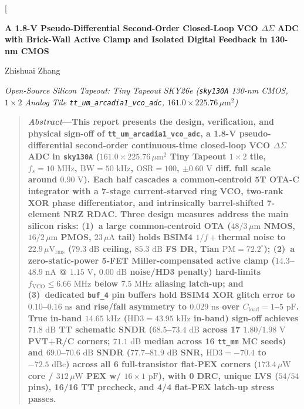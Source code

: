 \documentclass[10pt,twocolumn,letterpaper]{article}
\begin{document}
\thispagestyle{firstpage}

\twocolumn[{%
\begin{center}
  {\LARGE\bfseries A 1.8-V Pseudo-Differential Second-Order Closed-Loop VCO $\Delta\Sigma$ ADC with Brick-Wall Active Clamp and Isolated Digital Feedback in 130-nm CMOS\par}
  \vspace{5pt}
  {\normalsize Zhishuai Zhang\par}
  \vspace{1.5pt}
  {\footnotesize\itshape Open-Source Silicon Tapeout: Tiny Tapeout SKY26e (\textup{\texttt{sky130A}} 130-nm CMOS, $1\times2$ Analog Tile \textup{\texttt{tt\_um\_arcadia1\_vco\_adc}}, $161.0 \times 225.76\,\mu\text{m}^2$)\par}
\end{center}
\vspace{3pt}
\begin{quote}
\small
\textbf{\textit{Abstract}---This report presents the design, verification, and physical sign-off of \textup{\texttt{tt\_um\_arcadia1\_vco\_adc}}, a 1.8-V pseudo-differential second-order continuous-time closed-loop VCO $\Delta\Sigma$ ADC in \textup{\texttt{sky130A}} ($161.0\times225.76\,\mu\text{m}^2$ Tiny Tapeout $1\times2$ tile, $f_s=10\text{ MHz}$, $\text{BW}=50\text{ kHz}$, $\text{OSR}=100$, $\pm0.60\text{ V}$ diff. full scale around $0.90\text{ V}$). Each half cascades a common-centroid 5T OTA-C integrator with a 7-stage current-starved ring VCO, two-rank XOR phase differentiator, and intrinsically barrel-shifted 7-element NRZ RDAC. Three design measures address the main silicon risks: (1)~a large common-centroid OTA ($48/3\,\mu\text{m}$ NMOS, $16/2\,\mu\text{m}$ PMOS, $23\,\mu\text{A}$ tail) holds BSIM4 $1/f+$thermal noise to $22.9\,\mu\text{V}_{\text{rms}}$ ($79.3\text{ dB}$ ceiling, $85.3\text{ dB}$ FS DR, Tian $\text{PM}=72.2^\circ$); (2)~a zero-static-power 5-FET Miller-compensated active clamp ($14.3$--$48.9\text{ nA}$ @ $1.15\text{ V}$, $0.00\text{ dB}$ noise/HD3 penalty) hard-limits $f_{\text{VCO}}\le6.66\text{ MHz}$ below $7.5\text{ MHz}$ aliasing latch-up; and (3)~dedicated \textup{\texttt{buf\_4}} pin buffers hold BSIM4 XOR glitch error to $0.10$--$0.16\text{ ns}$ and rise/fall asymmetry to $0.029\text{ ns}$ over $C_{\text{load}}=1$--$5\text{ pF}$. True in-band $14.65\text{ kHz}$ ($\text{HD3}=43.95\text{ kHz}$ in-band) sign-off achieves $71.8\text{ dB}$ TT schematic SNDR ($68.5$--$73.4\text{ dB}$ across 17 $1.80/1.98\text{ V}$ PVT+R/C corners; $71.1\text{ dB}$ median across 16 \textup{\texttt{tt\_mm}} MC seeds) and \textbf{$69.0$--$70.6\text{ dB}$ SNDR} ($77.7$--$81.9\text{ dB}$ SNR, $\text{HD3}=-70.4$ to $-72.5\text{ dBc}$) across all 6 full-transistor flat-PEX corners ($173.4\,\mu\text{W}$ core / $312\,\mu\text{W}$ PEX w/ $16\times1\text{ pF}$), with 0 DRC, unique LVS ($54/54$ pins), 16/16 TT precheck, and 4/4 flat-PEX latch-up stress passes.}


\end{quote}}
\end{document}

